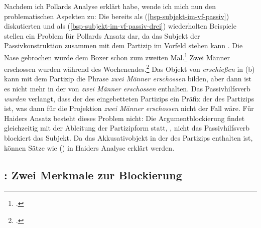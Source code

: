 {Nachdem ich Pollards Analyse erklärt habe, wende ich mich nun den problematischen
Aspekten zu: Die bereits als (\ref{bsp-subjekt-im-vf-passiv}) diskutierten und als
(\ref{bsp-subjekt-im-vf-passiv-drei}) wiederholten Beispiele stellen ein Problem
für Pollards Ansatz dar, da das Subjekt der Passivkonstruktion
zusammen mit dem Partizip im Vorfeld stehen kann \citep[]{Mueller99a}.
\eal
\label{bsp-subjekt-im-vf-passiv-drei}
\ex{}
Die Nase gebrochen wurde dem Boxer schon zum zweiten Mal.\footnote{
        .
}
\ex{}
Zwei Männer erschossen wurden    während des Wochenendes.\footnote{
        .%
        }
\label{bsp-subjekt-im-vf-passiv-letzt-drei}
\zl
Das Objekt von \emph{erschießen} in (b) kann mit dem Partizip die Phrase
\emph{zwei Männer erschossen} bilden, aber dann ist es nicht mehr in der \compsl von
\emph{zwei Männer erschossen} enthalten. Das Passivhilfsverb \emph{wurden} verlangt,
dass der \ergw des eingebetteten Partizips ein Präfix der \compsl des Partizips ist,
was dann für die Projektion \emph{zwei Männer erschossen} nicht der Fall wäre.
Für Haiders Ansatz besteht dieses Problem nicht: Die Argumentblockierung
findet gleichzeitig mit der Ableitung der Partizipform statt, \dash, nicht das Passivhilfsverb
blockiert das Subjekt. Da das Akkusativobjekt in der \compsl des Partizips enthalten
ist, können Sätze wie () in Haiders Analyse erklärt werden.

\subsection{: Zwei Merkmale zur Blockierung}
\label{sec-kathol-passive}

}
